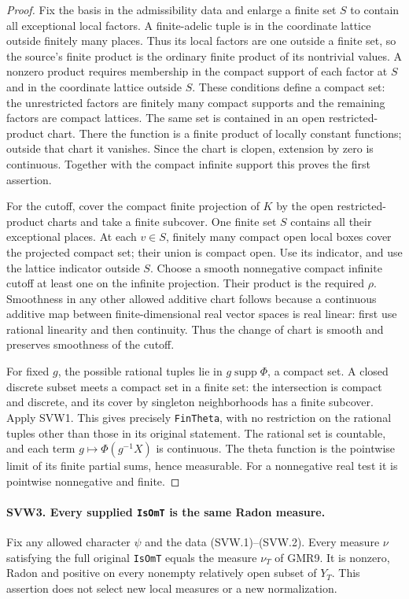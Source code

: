 \begin{proof}
Fix the basis in the admissibility data and enlarge a finite set
$S$ to contain all exceptional local factors.  A finite-adelic tuple
is in the coordinate lattice outside finitely many places.  Thus its
local factors are one outside a finite set, so the source's finite
product is the ordinary finite product of its nontrivial values.
A nonzero product requires membership in the compact support of
each factor at $S$ and in the coordinate lattice outside $S$.
These conditions define a compact set: the unrestricted factors
are finitely many compact supports and the remaining factors are
compact lattices.  The same set is contained in an open
restricted-product chart.  There the function is a finite product
of locally constant functions; outside that chart it vanishes.
Since the chart is clopen, extension by zero is continuous.
Together with the compact infinite support this proves the first
assertion.

For the cutoff, cover the compact finite projection of $K$ by the
open restricted-product charts and take a finite subcover.  One
finite set $S$ contains all their exceptional places.  At each
$v\in S$, finitely many compact open local boxes cover the projected
compact set; their union is compact open.  Use its indicator, and
use the lattice indicator outside $S$.  Choose a smooth nonnegative
compact infinite cutoff at least one on the infinite projection.
Their product is the required $\rho$.  Smoothness in any other
allowed additive chart follows because a continuous additive map
between finite-dimensional real vector spaces is real linear:
first use rational linearity and then continuity.  Thus the change
of chart is smooth and preserves smoothness of the cutoff.

For fixed $g$, the possible rational tuples lie in
$g\operatorname{supp}\Phi$, a compact set.  A closed discrete subset
meets a compact set in a finite set: the intersection is compact
and discrete, and its cover by singleton neighborhoods has a finite
subcover.  Apply SVW1.  This gives precisely \texttt{FinTheta}, with
no restriction on the rational tuples other than those in its
original statement.  The rational set is countable, and each term
$g\mapsto\Phi(g^{-1}X)$ is continuous.  The theta function is the
pointwise limit of its finite partial sums, hence measurable.
For a nonnegative real test it is pointwise nonnegative and finite.
\end{proof}

\paragraph{SVW3. Every supplied \texttt{IsOmT} is the same Radon measure.}
\label{claim:SVW3}
Fix any allowed character $\psi$ and the data (SVW.1)--(SVW.2).
Every measure $\nu$ satisfying the full original \texttt{IsOmT}
equals the measure $\nu_T$ of GMR9.  It is nonzero, Radon and positive
on every nonempty relatively open subset of $Y_T$.  This assertion
does not select new local measures or a new normalization.

